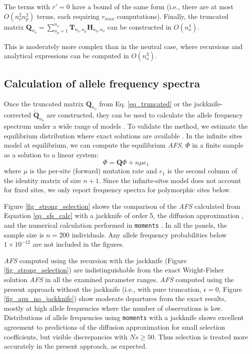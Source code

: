 \documentclass[9pt,twocolumn,twoside,lineno]{gsajnl}
\begin{document}
The terms  with $r'=0$ have a bound of the same form (i.e., there are at most $O(n_o^2 n_p^2)$ terms, each requiring $r_{max}$ computations).  Finally, the truncated matrix $\mathbf{Q}_{n_o} =
\sum_{n_p=1}^{n_{o}} \mathbf{T}_{n_o,n_p} \mathbf{H}_{n_p,n_o}$ can be constructed in $O(n_o^4)$.

This is moderately more complex than in the neutral case, where recursions \citep{BhaskarEtAl2014}
 and analytical expressions \citep{Lessard2010} can be computed in $O(n_o^3).$


\subsection{Calculation of allele frequency spectra}
\label{subsec_afs}

Once the truncated matrix $\mathbf{Q}_{n_o}$ from Eq. \ref{eq_truncated} or 
the jackknife-corrected  $\tilde {\mathbf{Q}}_{n_o}$ are constructed, they can be
used to calculate the allele frequency spectrum under a wide range of models \citep{JouganousEtAl2017}. 
To validate the method, we estimate the equilibrium
distribution where exact solutions are available \citep{Krukov2016}. In the infinite sites model at
equilibrium, we can compute the equilibrium \textit{AFS}, $\Phi$ in a finite sample as a solution to
a linear system:
\begin{equation}
  \label{eq_sfs_calc}
  \Phi = \mathbf{Q}\Phi  + n \mu e_1
\end{equation}
where $\mu$ is the per-site (forward) mutation rate and $e_1$ is the second column of the identity
matrix of size $n+1.$ Since the infinite-sites model does not account for fixed sites,
we only report frequency spectra for polymorphic sites below.

Figure \ref{fig_strong_selection} shows the comparison of the \textit{AFS} calculated from Equation
\ref{eq_sfs_calc} with a jackknife of order 5,
the diffusion approximation \cite[eq. 9.23]{Ewens2004}, and the numerical
calculation performed in \texttt{moments} \citep{JouganousEtAl2017}. In all the panels, the sample
size is $n=200$ individuals. Any allele frequency probabilities below $1\times10^{-12}$ are not
included in the figures. 

\textit{AFS} computed using the recursion with the jackknife (Figure \ref{fig_strong_selection}) are 
indistinguishable from the exact Wright-Fisher solution \textit{AFS} in all the examined 
parameter ranges. \textit{AFS} computed using the present approach without the jackknife 
(i.e., with pure truncation, $\epsilon = 0$, Figure \ref{fig_apx_no_jackknife}) show moderate departures from the exact results, 
mostly at high allele frequencies where the number of observations is low. 
Distributions of allele frequencies using \texttt{moments} with a jackknife shows 
excellent agreement to predictions of the diffusion approximation for small selection 
coefficients, but visible discrepancies with $Ns\ge 50.$ Thus selection is treated more 
accurately in the present approach, as expected. 
\end{document}

